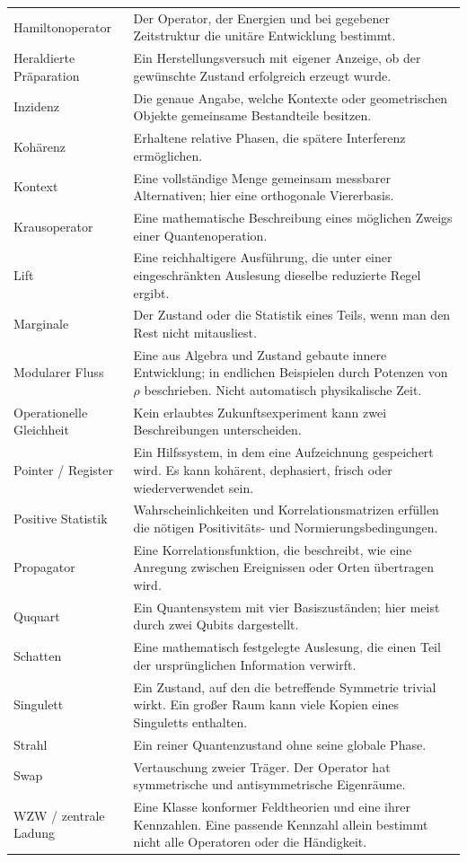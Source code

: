 \begin{longtable}{L{34mm}L{116mm}}
Hamiltonoperator&Der Operator, der Energien und bei gegebener Zeitstruktur die unitäre Entwicklung bestimmt.\\
Heraldierte Präparation&Ein Herstellungsversuch mit eigener Anzeige, ob der gewünschte Zustand erfolgreich erzeugt wurde.\\
Inzidenz&Die genaue Angabe, welche Kontexte oder geometrischen Objekte gemeinsame Bestandteile besitzen.\\
Kohärenz&Erhaltene relative Phasen, die spätere Interferenz ermöglichen.\\
Kontext&Eine vollständige Menge gemeinsam messbarer Alternativen; hier eine orthogonale Viererbasis.\\
Krausoperator&Eine mathematische Beschreibung eines möglichen Zweigs einer Quantenoperation.\\
Lift&Eine reichhaltigere Ausführung, die unter einer eingeschränkten Auslesung dieselbe reduzierte Regel ergibt.\\
Marginale&Der Zustand oder die Statistik eines Teils, wenn man den Rest nicht mitausliest.\\
Modularer Fluss&Eine aus Algebra und Zustand gebaute innere Entwicklung; in endlichen Beispielen durch Potenzen von $\rho$ beschrieben. Nicht automatisch physikalische Zeit.\\
Operationelle Gleichheit&Kein erlaubtes Zukunftsexperiment kann zwei Beschreibungen unterscheiden.\\
Pointer / Register&Ein Hilfssystem, in dem eine Aufzeichnung gespeichert wird. Es kann kohärent, dephasiert, frisch oder wiederverwendet sein.\\
Positive Statistik&Wahrscheinlichkeiten und Korrelationsmatrizen erfüllen die nötigen Positivitäts- und Normierungsbedingungen.\\
Propagator&Eine Korrelationsfunktion, die beschreibt, wie eine Anregung zwischen Ereignissen oder Orten übertragen wird.\\
Ququart&Ein Quantensystem mit vier Basiszuständen; hier meist durch zwei Qubits dargestellt.\\
Schatten&Eine mathematisch festgelegte Auslesung, die einen Teil der ursprünglichen Information verwirft.\\
Singulett&Ein Zustand, auf den die betreffende Symmetrie trivial wirkt. Ein großer Raum kann viele Kopien eines Singuletts enthalten.\\
Strahl&Ein reiner Quantenzustand ohne seine globale Phase.\\
Swap&Vertauschung zweier Träger. Der Operator hat symmetrische und antisymmetrische Eigenräume.\\
WZW / zentrale Ladung&Eine Klasse konformer Feldtheorien und eine ihrer Kennzahlen. Eine passende Kennzahl allein bestimmt nicht alle Operatoren oder die Händigkeit.\\\bottomrule
\end{longtable}

